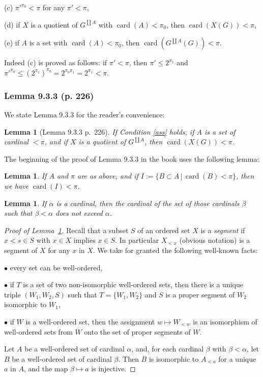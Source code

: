 \documentclass[12pt]{article}%
\newtheorem{lem}[thm]{Lemma}
\theoremstyle{remark}
\theoremstyle{definition}
\newcommand{\bu}{\bullet}
\newcommand{\nn}{\noindent}
\DeclareMathOperator{\card}{card}%
\begin{document}
(c) $\pi'^{\pi_0}<\pi$ for any $\pi'<\pi$, 

(d) if $X$ is a quotient of $G^{\coprod A}$ with $\card(A)<\pi_0$, then $\card(X(G))<\pi$, 

(e) if $A$ is a set with $\card(A)<\pi_0$, then $\card(G^{\coprod A}(G))<\pi$.

\nn Indeed (c) is proved as follows: if $\pi'<\pi$, then $\pi'\le2^{\pi_1}$ and $\pi'^{\pi_0}\le(2^{\pi_1})^{\pi_0}=2^{\pi_0\pi_1}=2^{\pi_1}<\pi$.

\subsubsection{Lemma 9.3.3 (p. 226)}

We state Lemma 9.3.3 for the reader's convenience:

\begin{lem}[Lemma 9.3.3 p.~226]\label{933}
If Condition \ref{ass} holds, if $A$ is a set of cardinal $<\pi$, and if $X$ is a quotient of $G^{\coprod A}$, then $\card(X(G))<\pi$.
\end{lem}

The beginning of the proof of Lemma 9.3.3 in the book uses the following lemma:

\begin{lem}\label{cardipi}
If $A$ and $\pi$ are as above, and if $I:=\{B\subset A\,|\,\card(B)<\pi\}$, then we have $\card(I)<\pi$. 
\end{lem}

\begin{lem}\label{ord}
If $\alpha$ is a cardinal, then the cardinal of the set of those cardinals $\beta$ such that $\beta<\alpha$ does not exceed $\alpha$.
\end{lem}

\begin{proof}[Proof of Lemma~\ref{ord}]
Recall that a subset $S$ of an ordered set $X$ is a {\em segment} if $x<s\in S$ with $x\in X$ implies $x\in S$. In particular $X_{<x}$ (obvious notation) is a segment of $X$ for any $x$ in $X$. We take for granted the following well-known facts:

\nn$\bu$ every set can be well-ordered,

\nn$\bu$ if $T$ is a set of two non-isomorphic well-ordered sets, then there is a unique triple $(W_1,W_2,S)$ such that $T=\{W_1,W_2\}$ and $S$ is a proper segment of $W_2$ isomorphic to $W_1$,

\nn$\bu$ if $W$ is a well-ordered set, then the assignment $w\mapsto W_{<w}$ is an isomorphism of well-ordered sets from $W$ onto the set of proper segments of $W$.

Let $A$ be a well-ordered set of cardinal $\alpha$, and, for each cardinal $\beta$ with $\beta<\alpha$, let $B$ be a well-ordered set of cardinal $\beta$. Then $B$ is isomorphic to $A_{<a}$ for a unique $a$ in $A$, and the map $\beta\mapsto a$ is injective.
\end{proof}
\end{document}

